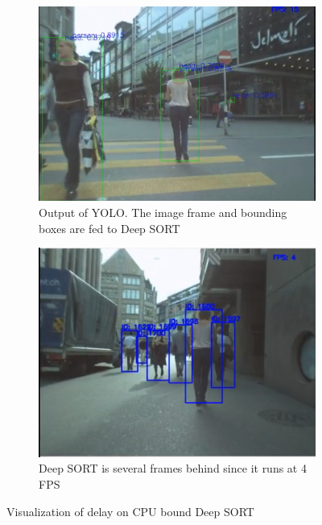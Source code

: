 \begin{figure}[ht]
	\begin{subfigure}[b]{.45\textwidth}
		\centering
		\includegraphics[width=1.0\linewidth]{img/chapter5_implementation/deepSortCPU.png}
		\caption{Output of YOLO. The image frame and bounding boxes are fed to Deep SORT}
	\end{subfigure}%
	\hspace{\fill} 
	\begin{subfigure}[b]{.45\textwidth}
		\centering
		\includegraphics[width=0.935\linewidth]{img/chapter5_implementation/deepSortCPU1.png}
		\caption{Deep SORT is several frames behind since it runs at 4 FPS}
	\end{subfigure}
	\vspace{-1\baselineskip}
	\begin{center}
		\caption{Visualization of delay on CPU bound Deep SORT}
		\label{fig:deepSortCPU}
	\end{center}
\end{figure}


